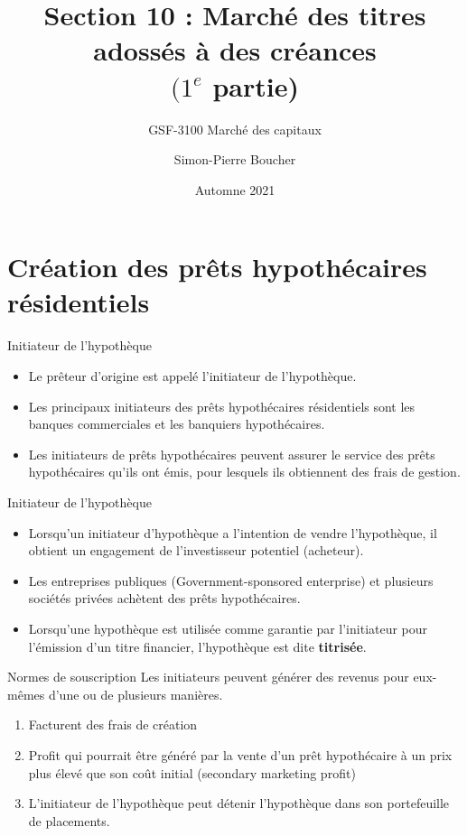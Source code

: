 \documentclass{beamer}
\title[S10]{Section 10 : Marché des titres adossés à des créances \\ $(1^{e}$ partie)}
\subtitle{GSF-3100 Marché des capitaux}
\author[SP. Boucher]{Simon-Pierre Boucher\inst{1}}
\institute[Université Laval]
{
  \inst{1}%
  Département de finance, assurance et immobilier\\
  Faculté des sciences de l'administration\\
  Université Laval}
\date[Automne 2021]{Automne 2021}
\begin{document}
\begin{frame}
  \titlepage
\end{frame}



\section{Création des prêts hypothécaires résidentiels}
\begin{frame}{Initiateur de l'hypothèque}
\begin{itemize}[label=\bullet]
\item Le prêteur d'origine est appelé l'initiateur de l'hypothèque.
\vspace{0.5cm}
\item Les principaux initiateurs des prêts hypothécaires résidentiels sont les banques commerciales et les banquiers hypothécaires.
\vspace{0.5cm}
\item Les initiateurs de prêts hypothécaires peuvent assurer le service des prêts hypothécaires qu'ils ont émis, pour lesquels ils obtiennent des frais de gestion.
\end{itemize}
\end{frame}


\begin{frame}{Initiateur de l'hypothèque}
\begin{itemize}[label=\bullet]
\item Lorsqu'un initiateur d'hypothèque a l'intention de vendre l'hypothèque, il obtient un engagement de l'investisseur potentiel (acheteur).
\vspace{0.5cm}
\item Les entreprises publiques (Government-sponsored enterprise) et plusieurs sociétés privées achètent des prêts hypothécaires.
\vspace{0.5cm}
\item Lorsqu'une hypothèque est utilisée comme garantie par l'initiateur pour l'émission d'un titre financier, l'hypothèque est dite \textbf{titrisée}.
\end{itemize}
\end{frame}


\begin{frame}{Normes de souscription}
Les initiateurs peuvent générer des revenus pour eux-mêmes d'une ou de plusieurs manières.
\begin{enumerate}[label=\arabic*)]
\item Facturent des frais de création
\item Profit qui pourrait être généré par la vente d'un prêt hypothécaire à un prix plus élevé que son coût initial (secondary marketing profit)
\item L'initiateur de l'hypothèque peut détenir l'hypothèque dans son portefeuille de placements.
\end{enumerate}
\end{frame}
\end{document}
